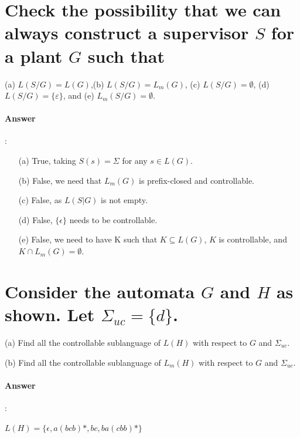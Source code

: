 \documentclass{article}
\begin{document}
\section{Check the possibility that we can always construct a supervisor $S$ for a plant $G$ such that}
(a) $L(S / G)=L(G)$,(b) $L(S / G)=L_m(G)$, (c) $L(S / G)=\emptyset$, (d) $L(S / G)=\{\varepsilon\}$, and (e) $L_m(S / G)=\emptyset$.


\paragraph{Answer}:
\begin{itemize}
  \item[(a)] True, taking $S(s) = \Sigma$ for any $s \in L(G)$.
  \item[(b)] False, we need that $L_m(G)$ is prefix-closed and controllable. 
  \item[(c)] False, as $L(S|G)$ is not empty.
  \item[(d)] False, $\{\epsilon\}$ needs to be controllable.
  \item[(e)] False, we need to have K such that $K \subseteq L(G)$, $K$ is controllable, and $K \cap L_m(G) = \emptyset$. 
\end{itemize}

\section{Consider the automata $G$ and $H$ as shown. Let $\Sigma_{uc} = \{d\}$.}
(a) Find all the controllable sublanguage of $L(H)$ with respect to $G$ and $\Sigma_{u c}$.

(b) Find all the controllable sublanguage of $L_m(H)$ with respect to $G$ and $\Sigma_{u c}$.

\paragraph{Answer}:

$L(H)=\{ \epsilon, a(bcb)*, bc, ba(cbb)* \}$
\end{document}
